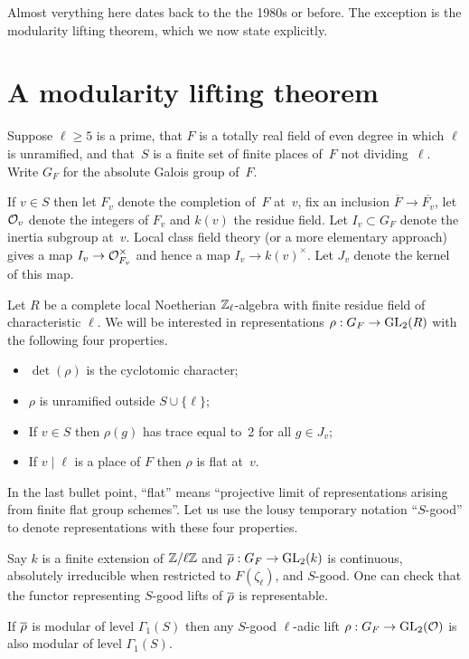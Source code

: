 Almost verything here dates back to the the 1980s or before.
The exception is the modularity lifting theorem, which we now state explicitly.

\section{A modularity lifting theorem}

Suppose $\ell\geq5$ is a prime, that $F$ is a totally real field of even degree in which $\ell$
is unramified, and that~$S$ is a finite set of finite places of~$F$ not dividing~$\ell$. Write
$G_F$ for the absolute Galois group of~$F$.

If $v\in S$ then let $F_v$ denote the completion of~$F$ at~$v$, fix an inclusion $\overline{F}\to\overline{F_v}$,
let $\mathcal{O}_v$ denote the integers of $F_v$ and $k(v)$ the residue field. Let $I_v\subset G_F$ denote the inertia 
subgroup at~$v$. Local class field theory (or a more elementary approach) gives a map $I_v\to\mathcal{O}_{F_v}^\times$
and hence a map $I_v\to k(v)^\times$. Let $J_v$ denote the kernel of this map.

Let $R$ be a complete local Noetherian $\mathbb{Z}_\ell$-algebra with finite residue field of characteristic $\ell$.
We will be interested in representations $\rho:G_F\to\operatorname{GL}_2(R)$ with the following four properties.
\begin{itemize}
    \item $\det(\rho)$ is the cyclotomic character;
    \item $\rho$ is unramified outside $S\cup\{\ell\}$;
    \item If $v\in S$ then $\rho(g)$ has trace equal to~2 for all $g\in J_v$;
    \item If $v\mid\ell$ is a place of $F$ then $\rho$ is flat at~$v$.
\end{itemize}

In the last bullet point, ``flat'' means ``projective limit of representations arising from
finite flat group schemes''. Let us use the lousy temporary notation ``$S$-good'' to denote
representations with these four properties.

Say $k$ is a finite extension of $\mathbb{Z}/\ell\mathbb{Z}$ and $\overline{\rho}:G_F\to\operatorname{GL}_2(k)$ is continuous,
absolutely irreducible when restricted to $F(\zeta_\ell)$, and $S$-good. One can check
that the functor representing $S$-good lifts of $\overline{\rho}$ is representable.

\begin{theorem}\label{modularity_lifting_theorem}
        If $\overline{\rho}$ is modular of level $\Gamma_1(S)$ then any $S$-good $\ell$-adic lift
        $\rho:G_F\to\operatorname{GL}_2(\mathcal{O})$ is also modular of level $\Gamma_1(S)$.
\end{theorem}


